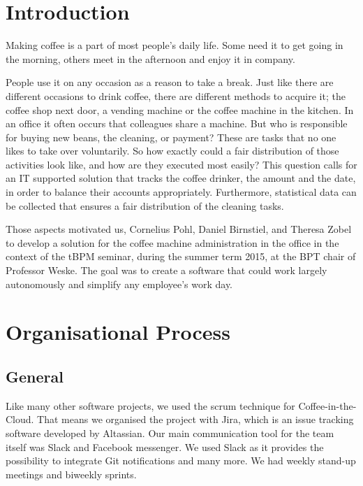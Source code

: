 \newpage
\section{Introduction}\label{introduction}

Making coffee is a part of most people's daily life. Some need it to get
going in the morning, others meet in the afternoon and enjoy it in
company.

People use it on any occasion as a reason to take a break. Just like
there are different occasions to drink coffee, there are different
methods to acquire it; the coffee shop next door, a vending machine or
the coffee machine in the kitchen. In an office it often occurs that
colleagues share a machine. But who is responsible for buying new beans,
the cleaning, or payment? These are tasks that no one likes to take over
voluntarily. So how exactly could a fair distribution of those
activities look like, and how are they executed most easily? This
question calls for an IT supported solution that tracks the coffee
drinker, the amount and the date, in order to balance their accounts
appropriately. Furthermore, statistical data can be collected that
ensures a fair distribution of the cleaning tasks.

Those aspects motivated us, Cornelius Pohl, Daniel Birnstiel, and
Theresa Zobel to develop a solution for the coffee machine
administration in the office in the context of the tBPM seminar, during
the summer term 2015, at the BPT chair of Professor Weske. The goal was
to create a software that could work largely autonomously and simplify
any employee's work day.

\newpage
\section{Organisational Process}\label{organisational-process}

\subsection{General}\label{general}

Like many other software projects, we used the scrum technique for
Coffee-in-the-Cloud. That means we organised the project with Jira,
which is an issue tracking software developed by Altassian. Our main
communication tool for the team itself was Slack and Facebook messenger.
We used Slack as it provides the possibility to integrate Git
notifications and many more. We had weekly stand-up meetings and
biweekly sprints.

